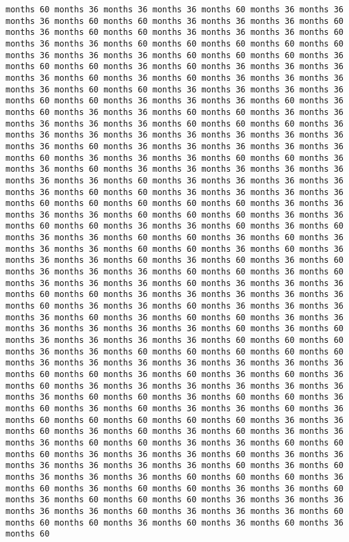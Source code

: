 \documentclass[11pt]{article}
\begin{document}
\begin{Verbatim}[commandchars=\\\{\}, frame=single, framerule=2mm, rulecolor=\color{outerrorbackground}]
months 60 months 36 months 36 months 36 months 60 months 36 months 36 months 36 months 60 months 60 months 36 months 36 months 36 months 60 months 36 months 60 months 60 months 36 months 36 months 36 months 60 months 36 months 36 months 60 months 60 months 60 months 60 months 60 months 36 months 36 months 36 months 60 months 60 months 60 months 36 months 60 months 60 months 36 months 60 months 36 months 36 months 36 months 36 months 60 months 36 months 60 months 36 months 36 months 36 months 36 months 60 months 60 months 36 months 36 months 36 months 36 months 60 months 60 months 36 months 36 months 36 months 60 months 36 months 60 months 36 months 36 months 60 months 60 months 36 months 36 months 36 months 36 months 36 months 60 months 60 months 60 months 36 months 36 months 36 months 36 months 36 months 36 months 36 months 36 months 36 months 60 months 36 months 36 months 36 months 36 months 36 months 60 months 36 months 36 months 36 months 60 months 60 months 36 months 36 months 60 months 36 months 36 months 36 months 36 months 36 months 36 months 36 months 60 months 36 months 36 months 36 months 36 months 36 months 60 months 60 months 36 months 36 months 36 months 36 months 60 months 60 months 60 months 60 months 60 months 36 months 36 months 36 months 36 months 60 months 60 months 60 months 36 months 36 months 60 months 60 months 36 months 36 months 60 months 36 months 60 months 36 months 36 months 60 months 60 months 36 months 60 months 36 months 36 months 36 months 60 months 60 months 36 months 60 months 36 months 36 months 36 months 60 months 36 months 60 months 36 months 60 months 36 months 36 months 36 months 60 months 60 months 36 months 60 months 36 months 36 months 36 months 60 months 36 months 36 months 36 months 60 months 60 months 36 months 36 months 36 months 36 months 36 months 60 months 36 months 36 months 60 months 36 months 36 months 36 months 36 months 60 months 36 months 60 months 60 months 36 months 36 months 36 months 36 months 36 months 36 months 60 months 36 months 60 months 36 months 36 months 36 months 36 months 60 months 60 months 60 months 36 months 36 months 60 months 60 months 60 months 60 months 60 months 36 months 36 months 36 months 36 months 36 months 36 months 36 months 60 months 60 months 36 months 60 months 36 months 60 months 36 months 60 months 36 months 36 months 36 months 36 months 36 months 36 months 36 months 60 months 60 months 36 months 60 months 60 months 36 months 60 months 36 months 60 months 36 months 36 months 60 months 36 months 60 months 60 months 60 months 60 months 60 months 36 months 36 months 60 months 36 months 60 months 36 months 60 months 36 months 36 months 36 months 60 months 60 months 36 months 36 months 60 months 60 months 60 months 36 months 36 months 36 months 60 months 36 months 36 months 36 months 36 months 36 months 36 months 60 months 36 months 60 months 36 months 36 months 36 months 60 months 60 months 60 months 36 months 60 months 36 months 60 months 60 months 36 months 36 months 60 months 36 months 60 months 60 months 60 months 36 months 36 months 36 months 36 months 36 months 60 months 36 months 36 months 36 months 60 months 60 months 60 months 36 months 60 months 36 months 60 months 36 months 60 
\end{Verbatim}
\end{document}
